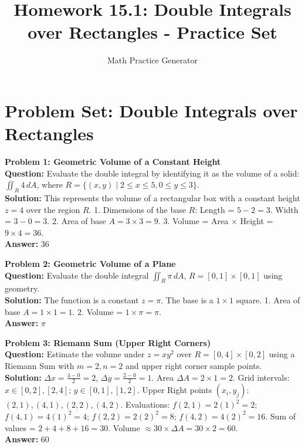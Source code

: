 \documentclass[11pt]{article}
\begin{document}
\title{Homework 15.1: Double Integrals over Rectangles - Practice Set}
\author{Math Practice Generator}
\date{}
\maketitle

\section*{Problem Set: Double Integrals over Rectangles}

\noindent\textbf{Problem 1: Geometric Volume of a Constant Height} \\
\textbf{Question:} Evaluate the double integral by identifying it as the volume of a solid: $\iint_R 4 \, dA$, where $R = \{(x,y) \mid 2 \leq x \leq 5, 0 \leq y \leq 3\}$. \\
\textbf{Solution:} This represents the volume of a rectangular box with a constant height $z = 4$ over the region $R$. 
1. Dimensions of the base $R$: Length = $5 - 2 = 3$. Width = $3 - 0 = 3$.
2. Area of base $A = 3 \times 3 = 9$.
3. Volume = Area $\times$ Height = $9 \times 4 = 36$. \\
\textbf{Answer:} 36

\vspace{0.5cm}
\noindent\textbf{Problem 2: Geometric Volume of a Plane} \\
\textbf{Question:} Evaluate the double integral $\iint_R \pi \, dA$, $R = [0,1] \times [0,1]$ using geometry. \\
\textbf{Solution:} The function is a constant $z = \pi$. The base is a $1 \times 1$ square.
1. Area of base $A = 1 \times 1 = 1$.
2. Volume = $1 \times \pi = \pi$. \\
\textbf{Answer:} $\pi$

\vspace{0.5cm}
\noindent\textbf{Problem 3: Riemann Sum (Upper Right Corners)} \\
\textbf{Question:} Estimate the volume under $z = xy^2$ over $R = [0,4] \times [0,2]$ using a Riemann Sum with $m=2, n=2$ and upper right corner sample points. \\
\textbf{Solution:} 
$\Delta x = \frac{4-0}{2} = 2$, $\Delta y = \frac{2-0}{2} = 1$. Area $\Delta A = 2 \times 1 = 2$.
Grid intervals: $x \in [0,2], [2,4]$; $y \in [0,1], [1,2]$. 
Upper Right points $(x_i, y_j)$: $(2,1), (4,1), (2,2), (4,2)$.
Evaluations: $f(2,1) = 2(1)^2 = 2$; $f(4,1) = 4(1)^2 = 4$; $f(2,2) = 2(2)^2 = 8$; $f(4,2) = 4(2)^2 = 16$.
Sum of values = $2 + 4 + 8 + 16 = 30$.
Volume $\approx 30 \times \Delta A = 30 \times 2 = 60$. \\
\textbf{Answer:} 60
\end{document}
